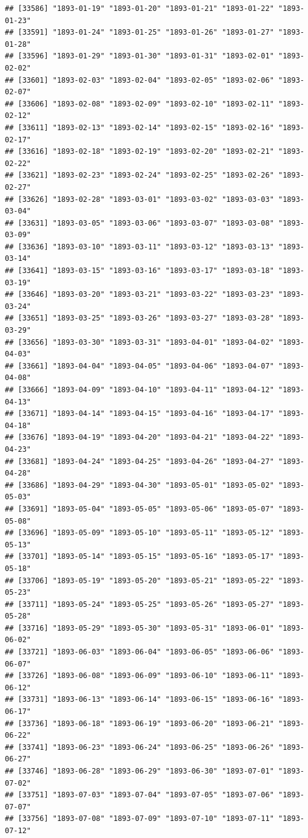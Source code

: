 \documentclass{article}\usepackage[]{graphicx}\usepackage[]{color}
\makeatletter
\newenvironment{kframe}{%
 \def\at@end@of@kframe{}%
 \ifinner\ifhmode%
  \def\at@end@of@kframe{\end{minipage}}%
  \begin{minipage}{\columnwidth}%
 \fi\fi%
 \def\FrameCommand##1{\hskip\@totalleftmargin \hskip-\fboxsep
 \colorbox{shadecolor}{##1}\hskip-\fboxsep
     \hskip-\linewidth \hskip-\@totalleftmargin \hskip\columnwidth}%
 \MakeFramed {\advance\hsize-\width
   \@totalleftmargin\z@ \linewidth\hsize
   \@setminipage}}%
 {\par\unskip\endMakeFramed%
 \at@end@of@kframe}
\newenvironment{knitrout}{}{} %
\makeatother
\begin{document}
\begin{description}
\begin{knitrout}
\begin{kframe}
\begin{verbatim}
## [33586] "1893-01-19" "1893-01-20" "1893-01-21" "1893-01-22" "1893-01-23"
## [33591] "1893-01-24" "1893-01-25" "1893-01-26" "1893-01-27" "1893-01-28"
## [33596] "1893-01-29" "1893-01-30" "1893-01-31" "1893-02-01" "1893-02-02"
## [33601] "1893-02-03" "1893-02-04" "1893-02-05" "1893-02-06" "1893-02-07"
## [33606] "1893-02-08" "1893-02-09" "1893-02-10" "1893-02-11" "1893-02-12"
## [33611] "1893-02-13" "1893-02-14" "1893-02-15" "1893-02-16" "1893-02-17"
## [33616] "1893-02-18" "1893-02-19" "1893-02-20" "1893-02-21" "1893-02-22"
## [33621] "1893-02-23" "1893-02-24" "1893-02-25" "1893-02-26" "1893-02-27"
## [33626] "1893-02-28" "1893-03-01" "1893-03-02" "1893-03-03" "1893-03-04"
## [33631] "1893-03-05" "1893-03-06" "1893-03-07" "1893-03-08" "1893-03-09"
## [33636] "1893-03-10" "1893-03-11" "1893-03-12" "1893-03-13" "1893-03-14"
## [33641] "1893-03-15" "1893-03-16" "1893-03-17" "1893-03-18" "1893-03-19"
## [33646] "1893-03-20" "1893-03-21" "1893-03-22" "1893-03-23" "1893-03-24"
## [33651] "1893-03-25" "1893-03-26" "1893-03-27" "1893-03-28" "1893-03-29"
## [33656] "1893-03-30" "1893-03-31" "1893-04-01" "1893-04-02" "1893-04-03"
## [33661] "1893-04-04" "1893-04-05" "1893-04-06" "1893-04-07" "1893-04-08"
## [33666] "1893-04-09" "1893-04-10" "1893-04-11" "1893-04-12" "1893-04-13"
## [33671] "1893-04-14" "1893-04-15" "1893-04-16" "1893-04-17" "1893-04-18"
## [33676] "1893-04-19" "1893-04-20" "1893-04-21" "1893-04-22" "1893-04-23"
## [33681] "1893-04-24" "1893-04-25" "1893-04-26" "1893-04-27" "1893-04-28"
## [33686] "1893-04-29" "1893-04-30" "1893-05-01" "1893-05-02" "1893-05-03"
## [33691] "1893-05-04" "1893-05-05" "1893-05-06" "1893-05-07" "1893-05-08"
## [33696] "1893-05-09" "1893-05-10" "1893-05-11" "1893-05-12" "1893-05-13"
## [33701] "1893-05-14" "1893-05-15" "1893-05-16" "1893-05-17" "1893-05-18"
## [33706] "1893-05-19" "1893-05-20" "1893-05-21" "1893-05-22" "1893-05-23"
## [33711] "1893-05-24" "1893-05-25" "1893-05-26" "1893-05-27" "1893-05-28"
## [33716] "1893-05-29" "1893-05-30" "1893-05-31" "1893-06-01" "1893-06-02"
## [33721] "1893-06-03" "1893-06-04" "1893-06-05" "1893-06-06" "1893-06-07"
## [33726] "1893-06-08" "1893-06-09" "1893-06-10" "1893-06-11" "1893-06-12"
## [33731] "1893-06-13" "1893-06-14" "1893-06-15" "1893-06-16" "1893-06-17"
## [33736] "1893-06-18" "1893-06-19" "1893-06-20" "1893-06-21" "1893-06-22"
## [33741] "1893-06-23" "1893-06-24" "1893-06-25" "1893-06-26" "1893-06-27"
## [33746] "1893-06-28" "1893-06-29" "1893-06-30" "1893-07-01" "1893-07-02"
## [33751] "1893-07-03" "1893-07-04" "1893-07-05" "1893-07-06" "1893-07-07"
## [33756] "1893-07-08" "1893-07-09" "1893-07-10" "1893-07-11" "1893-07-12"

\end{verbatim}
\end{kframe}
\end{knitrout}
\end{description}
\end{document}
